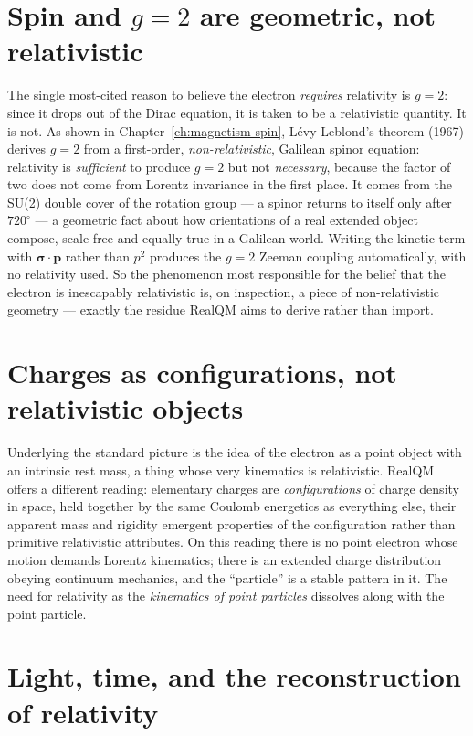 \section{Spin and \texorpdfstring{$g=2$}{g=2} are geometric, not relativistic}\label{sec:g2-nonrel}

The single most-cited reason to believe the electron \emph{requires} relativity is $g=2$: since it drops out of
the Dirac equation, it is taken to be a relativistic quantity. It is not. As shown in
Chapter~\ref{ch:magnetism-spin}, Lévy-Leblond's theorem (1967) derives $g=2$ from a first-order,
\emph{non-relativistic}, Galilean spinor equation: relativity is \emph{sufficient} to produce $g=2$ but not
\emph{necessary}, because the factor of two does not come from Lorentz invariance in the first place. It comes
from the SU(2) double cover of the rotation group --- a spinor returns to itself only after $720^\circ$ --- a
geometric fact about how orientations of a real extended object compose, scale-free and equally true in a
Galilean world. Writing the kinetic term with $\boldsymbol\sigma\!\cdot\!\mathbf p$ rather than $p^2$ produces
the $g=2$ Zeeman coupling automatically, with no relativity used. So the phenomenon most responsible for the
belief that the electron is inescapably relativistic is, on inspection, a piece of non-relativistic geometry ---
exactly the residue RealQM aims to derive rather than import.

\section{Charges as configurations, not relativistic objects}\label{sec:charges-config}

Underlying the standard picture is the idea of the electron as a point object with an intrinsic rest mass, a thing
whose very kinematics is relativistic. RealQM offers a different reading: elementary charges are
\emph{configurations} of charge density in space, held together by the same Coulomb energetics as everything else,
their apparent mass and rigidity emergent properties of the configuration rather than primitive relativistic
attributes. On this reading there is no point electron whose motion demands Lorentz kinematics; there is an
extended charge distribution obeying continuum mechanics, and the ``particle'' is a stable pattern in it. The
need for relativity as the \emph{kinematics of point particles} dissolves along with the point particle.

\section{Light, time, and the reconstruction of relativity}\label{sec:light-time}

